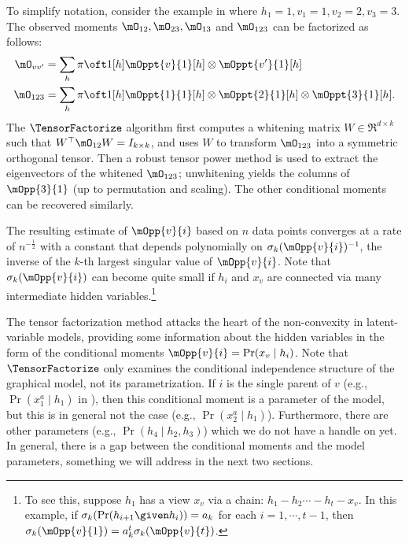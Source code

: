 To simplify notation, consider the example in  where $h_1=1,v_1=1,v_2=2,v_3=3$.
The observed moments $\mO_{12}, \mO_{23}, \mO_{13}$ and $\mO_{123}$ can be factorized as follows:
\begin{align*}
  \mO_{vv'} &= \sum_h {\pi \oft 1}[h] {\mOppt{v}{1}}[h] \otimes {\mOppt{v'}{1}}[h] \\ %
  \mO_{123} &= \sum_h {\pi \oft 1}[h] {\mOppt{1}{1}}[h] \otimes {\mOppt{2}{1}}[h] \otimes  {\mOppt{3}{1}}[h].
\end{align*}
The $\TensorFactorize$ algorithm first computes a whitening matrix $W \in
  \Re^{d \times k}$ such that $W^\top \mO_{12} W = I_{k \times k}$,
  and uses $W$ to transform $\mO_{123}$ into a symmetric orthogonal tensor.  
Then a robust tensor power method is used to extract the eigenvectors
of the whitened $\mO_{123}$; unwhitening yields the columns of $\mOpp{3}{1}$
(up to permutation and scaling).
The other conditional moments can be recovered similarly.

  The resulting estimate of %
  $\mOpp{v}{i}$ based on $n$ data points converges at a rate of $n^{-\frac12}$ with a constant
  that depends polynomially on $\sigma_k(\mOpp{v}{i})^{-1}$,
  the inverse of the $k$-th largest singular value of $\mOpp{v}{i}$.
Note that $\sigma_{k}(\mOpp{v}{i})$ can become quite
small if $h_i$ and $x_v$ are connected via many intermediate hidden
variables.\footnote{To see this, suppose $h_1$ has a view $x_v$ via a chain:
$h_1 - h_2 \cdots - h_t - x_v$. In this example, if
$\sigma_k(\Pr(h_{i+1} \given h_{i})) = a_k$ for each $i = 1,
\cdots, t-1$, then $\sigma_k(\mOpp{v}{1}) = a_k^t \sigma_k(\mOpp{v}{t})$.}

The tensor factorization method attacks the heart of the non-convexity
  in latent-variable models, providing some information about the hidden variables
  in the form of the conditional moments $\mOpp{v}{i} = \Pr(x_v \mid h_i)$.
  Note that $\TensorFactorize$ only examines the conditional independence structure
  of the graphical model, not its parametrization.
  If $i$ is the single parent of $v$ (e.g., $\Pr(x_1^a \mid h_1)$ in ),
  then this conditional moment is a parameter of the model,
  but this is in general not the case (e.g., $\Pr(x_2^a \mid h_1)$).
  Furthermore, there are other parameters (e.g., $\Pr(h_4 \mid h_2, h_3)$) which we do
  not have a handle on yet.
  In general, there is a gap between the conditional moments
  and the model parameters,
  something we will address in the next two sections.

